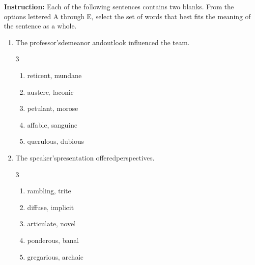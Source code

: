 \documentclass[12pt]{article}
\begin{document}
\hfill
{}
\noindent\textbf{Instruction:} Each of the following sentences contains two blanks. From the options lettered A through E, select the set of words that best fits the meaning of the sentence as a whole.
\begin{enumerate}[label=\textbf{\arabic*.}]
\item The professor's\underline{\hspace{2cm}}demeanor and\underline{\hspace{2cm}}outlook influenced the team.

\begin{multicols}{3}

\begin{enumerate}[label=(\Alph*)]

\item reticent, mundane

\item austere, laconic

\item petulant, morose

\item affable, sanguine

\item querulous, dubious

\end{enumerate}

\end{multicols}

\item The speaker's\underline{\hspace{2cm}}presentation offered\underline{\hspace{2cm}}perspectives.

\begin{multicols}{3}

\begin{enumerate}[label=(\Alph*)]

\item rambling, trite

\item diffuse, implicit

\item articulate, novel

\item ponderous, banal

\item gregarious, archaic


\end{enumerate}
\end{multicols}
\end{enumerate}
\end{document}
